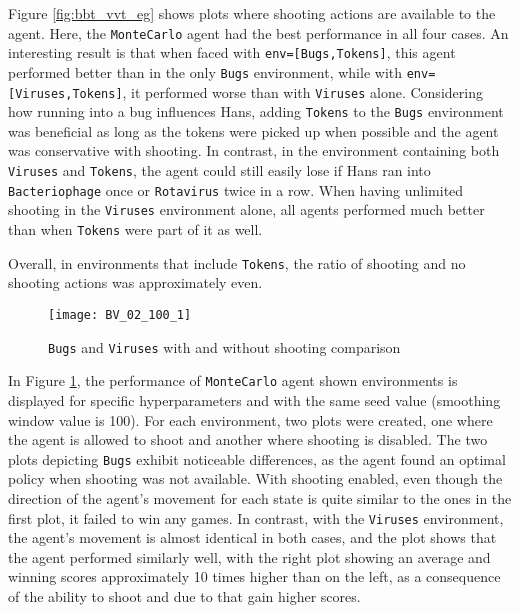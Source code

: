 Figure \ref{fig:bbt_vvt_eg} shows plots where shooting actions are available to the agent. Here, the \texttt{MonteCarlo} agent had the best performance in all four cases. An interesting result is that when faced with \texttt{env=[Bugs,Tokens]}, this agent performed better than in the only \texttt{Bugs} environment, while with \texttt{env=[Viruses,Tokens]}, it performed worse than with \texttt{Viruses} alone. Considering how running into a bug influences Hans, adding \texttt{Tokens} to the \texttt{Bugs} environment was beneficial as long as the tokens were picked up when possible and the agent was conservative with shooting. In contrast, in the environment containing both \texttt{Viruses} and \texttt{Tokens}, the agent could still easily lose if Hans ran into \texttt{Bacteriophage} once or \texttt{Rotavirus} twice in a row. When having unlimited shooting in the \texttt{Viruses} environment alone, all agents performed much better than when \texttt{Tokens} were part of it as well.

Overall, in environments that include \texttt{Tokens}, the ratio of shooting and no shooting actions was approximately even. 

\begin{figure}[h]
    \centering
    \texttt{[image: BV\_02\_100\_1]}
    \caption{\texttt{Bugs} and \texttt{Viruses} with and without shooting comparison}
    \label{fig:BV_02_100_1_eg}
\end{figure}


In Figure \ref{fig:BV_02_100_1_eg}, the performance of \texttt{MonteCarlo} agent shown environments is displayed for specific hyperparameters and with the same seed value (smoothing window value is 100). For each environment, two plots were created, one where the agent is allowed to shoot and another where shooting is disabled. The two plots depicting \texttt{Bugs} exhibit noticeable differences, as the agent found an optimal policy when shooting was not available. With shooting enabled, even though the direction of the agent's movement for each state is quite similar to the ones in the first plot, it failed to win any games. In contrast, with the \texttt{Viruses} environment, the agent's movement is almost identical in both cases, and the plot shows that the agent performed similarly well, with the right plot showing an average and winning scores approximately 10 times higher than on the left, as a consequence of the ability to shoot and due to that gain higher scores.

